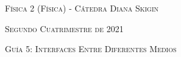 \documentclass[11pt,spanish]{article}
\begin{document}
    \begin{center}
    \textsc{\large Física 2 (Física) - Cátedra Diana Skigin}
    \par\end{center}{\large \par}
    
    \begin{center}
    \textsc{\large Segundo Cuatrimestre de 2021}
    \par\end{center}{\large \par}
    
    \begin{center}
    \textsc{\large Guía 5: Interfaces Entre Diferentes Medios}
    \par\end{center}{\large \par}
\end{document}
